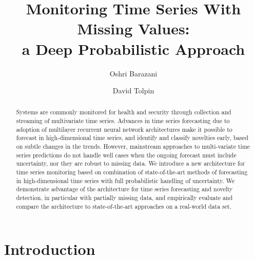 \documentclass[runningheads]{llncs}
\begin{document}
\title{Monitoring Time Series With Missing Values:\\a Deep Probabilistic Approach}

\author{Oshri Barazani \and David Tolpin}


\maketitle

\begin{abstract}
Systems are commonly monitored for health and security through
collection and streaming of multivariate time series. Advances
in time series forecasting due to adoption of multilayer
recurrent neural network architectures make it possible to
forecast in high-dimensional time series, and identify and
classify novelties early, based on subtle changes in the trends.
However, mainstream approaches to multi-variate time series
predictions do not handle well cases when the ongoing forecast
must include uncertainty, nor they are robust to missing data.
We introduce a new architecture for time series monitoring based
on combination of state-of-the-art methods of forecasting in
high-dimensional time series with full probabilistic handling of
uncertainty. We demonstrate advantage of the architecture for
time series forecasting and novelty detection, in particular
with partially missing data, and empirically evaluate and
compare the architecture to state-of-the-art approaches on a
real-world data set.
\end{abstract}



\section{Introduction}
\end{document}

